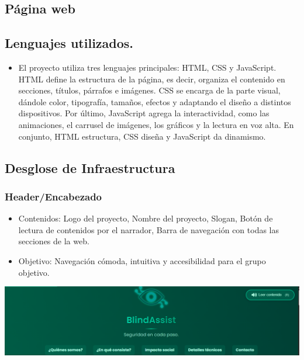 \documentclass[12pt,a4paper]{article}
\begin{document}
\subsection{Página web}

\subsection{Lenguajes utilizados. }
\begin{itemize}
\item El proyecto utiliza tres lenguajes principales: HTML, CSS y JavaScript. HTML define la estructura de la página, es decir, organiza el contenido en secciones, títulos, párrafos e imágenes. CSS se encarga de la parte visual, dándole color, tipografía, tamaños, efectos y adaptando el diseño a distintos dispositivos. Por último, JavaScript agrega la interactividad, como las animaciones, el carrusel de imágenes, los gráficos y la lectura en voz alta. En conjunto, HTML estructura, CSS diseña y JavaScript da dinamismo.
\end{itemize}

\subsection{Desglose de Infraestructura}
\subsubsection*{Header/Encabezado}
\begin{itemize}
\item Contenidos: Logo del proyecto, Nombre del proyecto, Slogan, Botón de lectura de contenidos por el narrador, Barra de navegación con todas las secciones de la web.
\item Objetivo: Navegación cómoda, intuitiva y accesibilidad para el grupo objetivo.
\end{itemize}

    \includegraphics[width=\linewidth]{Carpeta tecnica/header.png}
\end{document}
